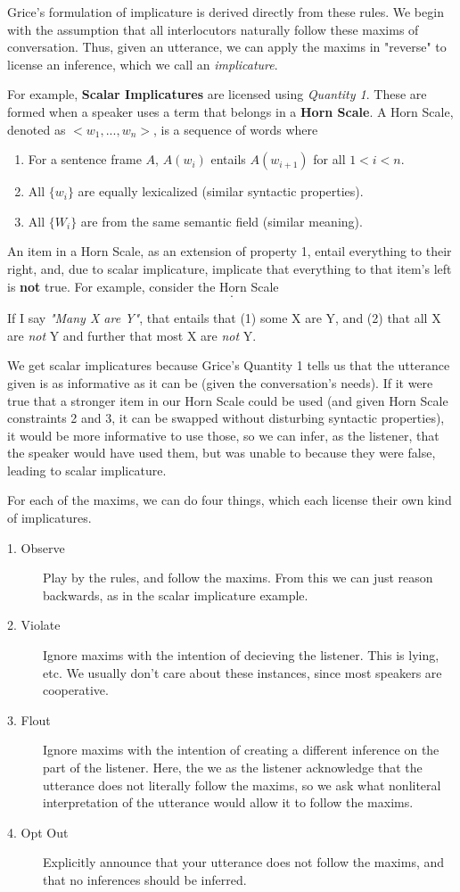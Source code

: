\documentclass[11pt]{article}
\begin{document}
Grice's formulation of implicature is derived directly from these rules. We begin with the assumption that
all interlocutors naturally follow these maxims of conversation. Thus, given an utterance, we can apply the 
maxims in "reverse" to license an inference, which we call an \textit{implicature}.

For example, \textbf{Scalar Implicatures} are licensed using \textit{Quantity 1}. These are formed when a
speaker uses a term that belongs in a \textbf{Horn Scale}. A Horn Scale, denoted as $<w_1,...,w_n>$, is a 
sequence of words where
\begin{enumerate}
    \item For a sentence frame $A$, $A(w_i)$ entails $A(w_{i+1})$ for all $1 < i < n$.
    \item All $\{w_i\}$ are equally lexicalized (similar syntactic properties).
    \item All $\{W_i\}$ are from the same semantic field (similar meaning).
\end{enumerate}
An item in a Horn Scale, as an extension of property 1, entail everything to their right, and, due to scalar
implicature, implicate that everything to that item's left is \textbf{not} true.
For example, consider the Horn Scale  
\[<all, most, many, some>.\] 
\par
If I say \textit{"Many X are Y"}, that 
entails that (1) some X are Y, and (2) that all X are \textit{not} Y and further that most X are \textit{not} 
Y.

We get scalar implicatures because Grice's Quantity 1 tells us that the utterance given is as informative as
it can be (given the conversation's needs). If it were true that a stronger item in our Horn Scale could be 
used (and given Horn Scale constraints 2 and 3, it can be swapped without disturbing syntactic properties), 
it would be more informative to use those, so we can infer, as the listener, that the speaker would have
used them, but was unable to because they were false, leading to scalar implicature.

For each of the maxims, we can do four things, which each license their own kind of implicatures. 
\begin{description}
    \item[1. Observe] Play by the rules, and follow the maxims. From this we can just reason backwards, as in
        the scalar implicature example.
    \item[2. Violate] Ignore maxims with the intention of decieving the listener. This is lying, etc. We usually
        don't care about these instances, since most speakers are cooperative.
    \item[3. Flout] Ignore maxims with the intention of creating a different inference on the part of the 
        listener. Here, the we as the listener acknowledge that the utterance does not literally follow the
        maxims, so we ask what nonliteral interpretation of the utterance would allow it to follow the maxims.
    \item[4. Opt Out] Explicitly announce that your utterance does not follow the maxims, and that no 
        inferences should be inferred.
\end{description}
\end{document}
